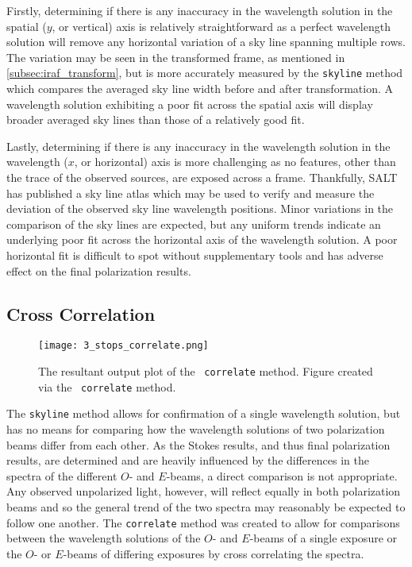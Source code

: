 Firstly, determining if there is any inaccuracy in the wavelength solution in the spatial ($y$, or vertical) axis is relatively straightforward as a perfect wavelength solution will remove any horizontal variation of a sky line spanning multiple rows. The variation may be seen in the transformed frame, as mentioned in \autoref{subsec:iraf_transform}, but is more accurately measured by the \texttt{skyline} method which compares the averaged sky line width before and after transformation. A wavelength solution exhibiting a poor fit across the spatial axis will display broader averaged sky lines than those of a relatively good fit.

Lastly, determining if there is any inaccuracy in the wavelength solution in the wavelength ($x$, or horizontal) axis is more challenging as no features, other than the trace of the observed sources, are exposed across a frame. Thankfully, \gls{SALT} has published a sky line atlas which may be used to verify and measure the deviation of the observed sky line wavelength positions. Minor variations in the comparison of the sky lines are expected, but any uniform trends indicate an underlying poor fit across the horizontal axis of the wavelength solution. A poor horizontal fit is difficult to spot without supplementary tools and has adverse effect on the final polarization results.

\subsection{Cross Correlation} \label{subsec:stops_correlate}



\begin{figure}[t]
    \centering
    \texttt{[image: 3\_stops\_correlate.png]}
    \caption{The resultant output plot of the \stops\ \texttt{correlate} method. Figure created via the \stops\ \texttt{correlate} method.}
    \label{fig:stops_corr_eg}
\end{figure}

The \texttt{skyline} method allows for confirmation of a single wavelength solution, but has no means for comparing how the wavelength solutions of two polarization beams differ from each other. As the Stokes results, and thus final polarization results, are determined and are heavily influenced by the differences in the spectra of the different $O$- and $E$-beams, a direct comparison is not appropriate. Any observed unpolarized light, however, will reflect equally in both polarization beams and so the general trend of the two spectra may reasonably be expected to follow one another. The \texttt{correlate} method was created to allow for comparisons between the wavelength solutions of the $O$- and $E$-beams of a single exposure or the $O$- or $E$-beams of differing exposures by cross correlating the spectra.

